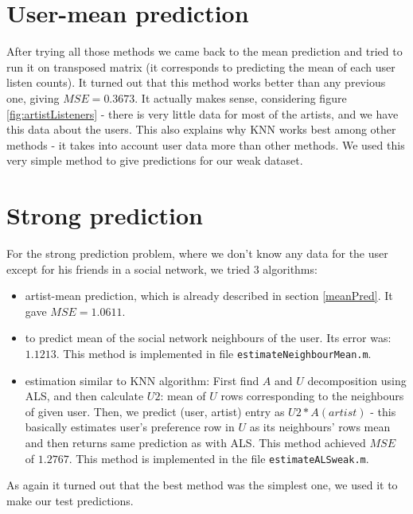 \documentclass{report}
\begin{document}
\section{User-mean prediction}
After trying all those methods we came back to the mean prediction and tried to run it on transposed matrix (it corresponds to predicting the mean of each user listen counts). It turned out that this method works better than any previous one, giving $MSE=0.3673$. It actually makes sense, considering figure \ref{fig:artistListeners} - there is very little data for most of the artists, and we have this data about the users. This also explains why KNN works best among other methods - it takes into account user data more than other methods. We used this very simple method to give predictions for our weak dataset.

\section{Strong prediction}
For the strong prediction problem, where we don't know any data for the user except for his friends in a social network, we tried $3$ algorithms:
\begin{itemize}
\item artist-mean prediction, which is already described in section \ref{meanPred}. It gave $MSE=1.0611$.
\item to predict mean of the social network neighbours of the user. Its error was: $1.1213$. This method is implemented in file \texttt{estimateNeighbourMean.m}.
\item estimation similar to KNN algorithm: First find $A$ and $U$ decomposition using ALS, and then calculate $U2$: mean of $U$ rows corresponding to the neighbours of given user. Then, we predict (user, artist) entry as $U2 * A(artist)$ - this basically estimates user's preference row in $U$ as its neighbours' rows mean and then returns same prediction as with ALS. This method achieved $MSE$ of $1.2767$. This method is implemented in the file \texttt{estimateALSweak.m}.
\end{itemize}

As again it turned out that the best method was the simplest one, we used it to make our test predictions.
\end{document}
